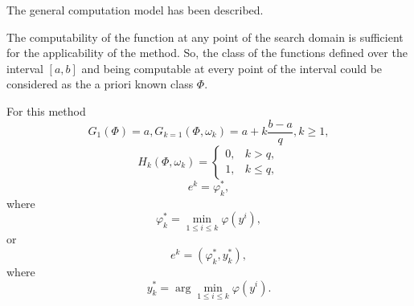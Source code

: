 The general computation model has been described. 


The computability of the function at any point of the search domain is sufficient for the applicability of the method. So, the class of the functions defined over the interval $[a,b]$ and being computable at every point of the interval could be considered as the a priori known class $\Phi$. 

For this method
\begin{displaymath}
G_1(\Phi)=a, G_{k=1}(\Phi,\omega_k)=a+k\frac{b-a}{q}, k\geq 1,
\end{displaymath}
\begin{displaymath}
  H_k(\Phi,\omega_k) =
  \begin{cases}
    0, & k > q, \\
    1, & k \leq q,
  \end{cases}
\end{displaymath}
\begin{equation}
\label{eq:18}
e^k=\varphi_k^*,
\end{equation}
where
\begin{equation}
\label{eq:19}
\varphi_k^*=\min_{1\leq i\leq k} \varphi(y^i),
\end{equation}
or
\begin{displaymath}
e^k=(\varphi_k^*,y_k^*),
\end{displaymath}
where 
\begin{displaymath}
y_k^*=\arg \min_{1\leq i\leq k} \varphi(y^i).
\end{displaymath}



